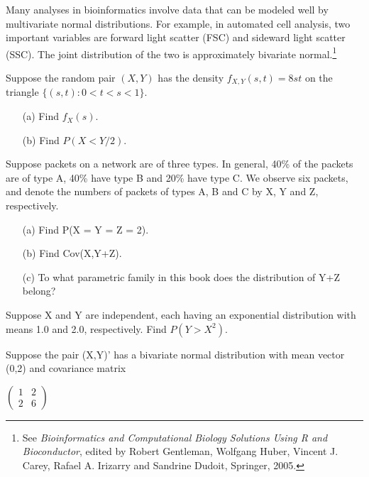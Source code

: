 Many analyses in bioinformatics involve data that can be modeled well by
multivariate normal distributions.  For example, in automated cell
analysis, two important variables are forward light scatter (FSC) and
sideward light scatter (SSC).  The joint distribution of the two is
approximately bivariate normal.\footnote{See {\it Bioinformatics and
Computational Biology Solutions Using R and Bioconductor}, edited by
Robert Gentleman, Wolfgang Huber, Vincent J. Carey, Rafael A. Irizarry
and Sandrine Dudoit, Springer, 2005.}

\startproblemset

\oneproblem
Suppose the random pair $(X,Y)$ has the density $f_{X,Y}(s,t) = 8st$
on the triangle $\{(s,t): 0 < t < s < 1\}$.

\begin{itemize}

\item [(a)] Find $f_X(s)$.

\item [(b)] Find $P(X < Y/2)$.

\end{itemize}

\oneproblem
 Suppose packets on a network are of three types.  In general,
40\% of the packets are of type A, 40\% have type B and 20\% have type
C.  We observe six packets, and denote the numbers of packets of types
A, B and C by X, Y and Z, respectively.

\begin{itemize}

\item [(a)] Find P(X = Y = Z = 2).

\item [(b)] Find Cov(X,Y+Z).

\item [(c)] To what parametric family in this book does
the distribution of Y+Z belong?

\end{itemize}

\oneproblem
Suppose X and Y are independent, each having an exponential
distribution with means 1.0 and 2.0, respectively.  Find $P(Y > X^2)$.

\oneproblem
Suppose the pair (X,Y)' has a bivariate normal distribution
with mean vector (0,2) and covariance matrix

$
\left (
   \begin{array}{cc}
   1 & 2 \\
   2 & 6   
   \end{array}
\right )     
$

